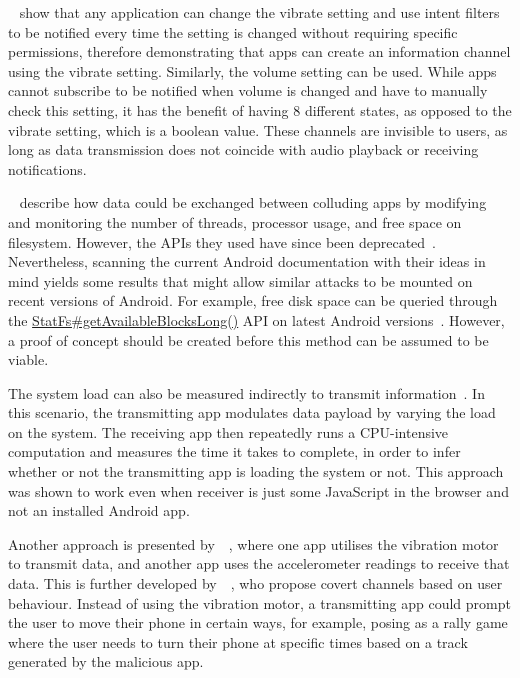 \documentclass[article, oneside]{aaltoseries}
\newcommand{\TODO}[1]{\todo[inline]{#1}}
\begin{document}
\citeauthor{Schlegel2011}~\cite{Schlegel2011} show that any application can change the vibrate setting and use intent filters to be notified every time the setting is changed without requiring specific permissions, therefore demonstrating that apps can create an information channel using the vibrate setting.  Similarly, the volume setting can be used. While apps cannot subscribe to be notified when volume is changed and have to manually check this setting, it has the benefit of having 8 different states, as opposed to the vibrate setting, which is a boolean value. These channels are invisible to users, as long as data transmission does not coincide with audio playback or receiving notifications.

\citeauthor{Marforio2012}~\cite{Marforio2012} describe how data could be exchanged between colluding apps by modifying and monitoring the number of threads, processor usage, and free space on filesystem. However, the APIs they used have since been deprecated~\cite{nn2017}. Nevertheless, scanning the current Android documentation with their ideas in mind yields some results that might allow similar attacks to be mounted on recent versions of Android. For example, free disk space can be queried through the \href{https://developer.android.com/reference/android/os/StatFs.html#getAvailableBlocksLong()}{StatFs\#getAvailableBlocksLong()} API on latest Android versions~\cite{AOSPdeveloper}. However, a proof of concept should be created before this method can be assumed to be viable.

The system load can also be measured indirectly to transmit information~\cite{Marforio2012}. In this scenario, the transmitting app modulates data payload by varying the load on the system. The receiving app then repeatedly runs a CPU-intensive computation and measures the time it takes to complete, in order to infer whether or not the transmitting app is loading the system or not. This approach was shown to work even when receiver is just some JavaScript in the browser and not an installed Android app.

Another approach is presented by~\citeauthor{Al-Haiqi2014}~\cite{Al-Haiqi2014}, where one app utilises the vibration motor to transmit data, and another app uses the accelerometer readings to receive that data. This is further developed by~\citeauthor{Qi2018}~\cite{Qi2018}, who propose covert channels based on user behaviour. Instead of using the vibration motor, a transmitting app could prompt the user to move their phone in certain ways, for example, posing as a rally game where the user needs to turn their phone at specific times based on a track generated by the malicious app.
\\
\TODO{Add a subsection conclusion paragraph}
\end{document}
